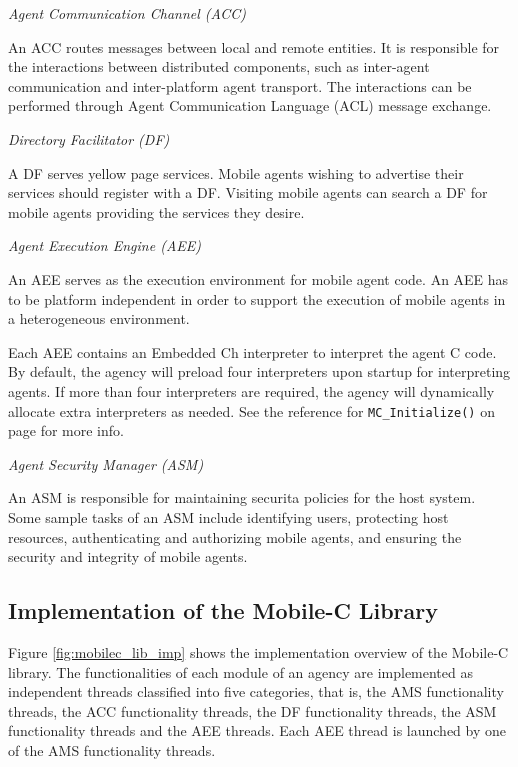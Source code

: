 \documentclass[11pt]{report}
\begin{document}
\textit{Agent Communication Channel (ACC)}

\noindent
An ACC routes messages between local and remote entities. 
It is responsible for the interactions between distributed components, such 
as inter-agent communication and inter-platform agent transport. 
The interactions can be performed through Agent Communication Language (ACL) 
message exchange.

\textit{Directory Facilitator (DF)}

\noindent
A DF serves yellow page services. 
Mobile agents wishing to advertise their services should register with a DF. 
Visiting mobile agents can search a DF for mobile agents providing the 
services they desire.

\textit{Agent Execution Engine (AEE)}

\noindent
An AEE serves as the execution environment for mobile agent code.
An AEE has to be platform independent in order to support the execution of 
mobile agents in a heterogeneous environment. 

Each AEE contains an Embedded Ch interpreter to interpret the agent C code.
By default, the agency will preload four interpreters upon startup for
interpreting agents. If more than four interpreters are required, the agency
will dynamically allocate extra interpreters as needed. See the reference for
\texttt{MC\_Initialize()} on page \pageref{api:MC_Initialize} for more info.

\textit{Agent Security Manager (ASM)}

\noindent
An ASM is responsible for maintaining securita policies for the host system.
Some sample tasks of an ASM include identifying users, protecting host 
resources, authenticating and authorizing mobile agents, and ensuring the 
security and integrity of mobile agents.

\subsection{Implementation of the Mobile-C Library}
Figure \ref{fig:mobilec_lib_imp} shows the implementation overview of the 
Mobile-C library.
The functionalities of each module of an agency are 
implemented as independent threads classified into five categories, that is, 
the AMS functionality threads, the ACC functionality threads, the DF 
functionality threads, the ASM functionality threads and the AEE threads.
Each AEE thread is launched by one of the AMS functionality threads.
\end{document}
